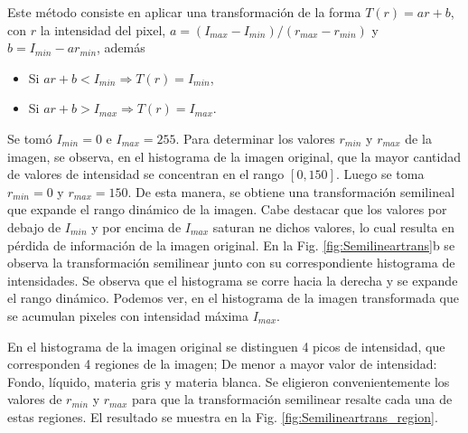 \documentclass[letterpaper,12pt]{article}
\theoremstyle{plain}
\begin{document}
Este método consiste en aplicar una transformación de la forma $T(r) = a r + b$, con $r$ la intensidad del pixel, $a = (I_{max} - I_{min})/(r_{max}-r_{min})$ y $b=I_{min} - ar_{min}$, además
\begin{itemize}
    \item Si $a r + b < I_{min} \Rightarrow T(r)=I_{min}$,
    \item Si $a r + b > I_{max} \Rightarrow T(r)=I_{max}$.
\end{itemize}
Se tomó $I_{min}=0$ e $I_{max}=255$. Para determinar los valores $r_{min}$ y $r_{max}$ de la imagen, se observa, en el histograma de la imagen original, que la mayor cantidad de valores de intensidad se concentran en el rango $[0, 150]$. Luego se toma $r_{min}=0$ y $r_{max}=150$. De esta manera, se obtiene una transformación semilineal que expande el rango dinámico de la imagen. Cabe destacar que los valores por debajo de $I_{min}$ y por encima de $I_{max}$ saturan ne dichos valores, lo cual resulta en pérdida de información de la imagen original. En la Fig. \ref{fig:Semilineartrans}b se observa la transformación semilinear junto con su correspondiente histograma de intensidades. Se observa que el histograma se corre hacia la derecha y se expande el rango dinámico. Podemos ver, en el histograma de la imagen transformada que se acumulan pixeles con intensidad máxima $I_{max}$.

En el histograma de la imagen original se distinguen 4 picos de intensidad, que corresponden 4 regiones de la imagen; De menor a mayor valor de intensidad: Fondo, líquido, materia gris y materia blanca. Se eligieron convenientemente los valores de $r_{min}$ y $r_{max}$ para que la transformación semilinear resalte cada una de estas regiones. El resultado se muestra en la Fig. \ref{fig:Semilineartrans_region}.
\end{document}
